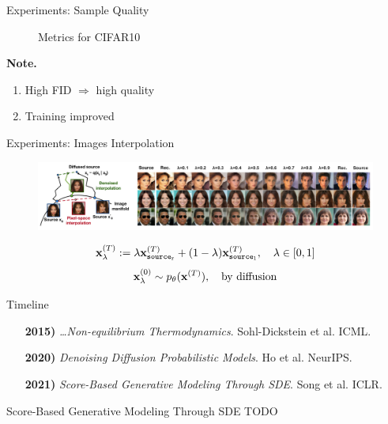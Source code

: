 \documentclass[aspectratio=169, 10pt]{beamer}
\theoremstyle{definition}
\begin{document}
\begin{frame}{Experiments: Sample Quality}
\begin{minipage}[t]{0.35\textwidth}
\begin{figure}[h]
      \caption{Metrics for CIFAR10}
    \end{figure}
    \textbf{Note.}
    \begin{enumerate}
      \item High FID $\Rightarrow$ high quality 
      \item Training improved
    \end{enumerate}
  \end{minipage}

\end{frame}
\begin{frame}{Experiments: Images Interpolation}
  \begin{figure}[h!]
    \centering
    \includegraphics[width=\textwidth]{./pic/ho_interpolation.png}
  \end{figure}
  \[
    {\mathbf{x}}^{(T)}_\lambda := \lambda{\mathbf{x}}^{(T)}_{\tt source_r} +
    (1-\lambda){\mathbf{x}}^{(T)}_{\tt source_l},\quad \lambda\in\left[ 0,1
    \right]
  \]
  \pause
  \[
    {\mathbf{x}}^{(0)}_\lambda \sim p_\theta({\mathbf{x}}^{(T)}),\quad \mbox{by diffusion}
  \]
\end{frame}
\begin{frame}{Timeline}
\begin{enumerate}
  \item[\bf 2015)] \textit{\ldots Non-equilibrium
  Thermodynamics}. Sohl-Dickstein et al. ICML. {\color{ggreen} \checkmark}\vfill
  \item[\bf 2020)] \textit{Denoising Diffusion Probabilistic Models}.
  Ho et al. NeurIPS.{\color{ggreen} \checkmark}\vfill
  \item[\bf 2021)] \textit{Score-Based Generative Modeling Through SDE}. Song et
    al. ICLR.
\end{enumerate}
\end{frame}
\begin{frame}{Score-Based Generative Modeling Through SDE}
  TODO
\end{frame}
\end{document}
